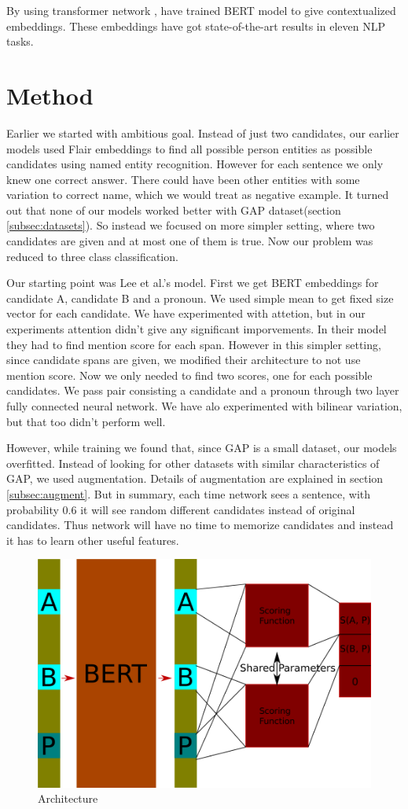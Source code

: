 \documentclass[11pt,a4paper]{article}
\begin{document}
By using transformer network \cite{vaswani2017attention}, \cite{devlin2018bert} have trained BERT model to give contextualized embeddings. These embeddings have got state-of-the-art results in eleven NLP tasks.

\section{Method}
Earlier we started with ambitious goal. Instead of just two candidates, our earlier models used Flair embeddings to find all possible person entities as possible candidates using named entity recognition. However for each sentence we only knew one correct answer. There could have been other entities with some variation to correct name, which we would treat as negative example. It turned out that none of our models worked better with GAP dataset(section \ref{subsec:datasets}). So instead we focused on more simpler setting, where two candidates are given and at most one of them is true. Now our problem was reduced to three class classification.

Our starting point was Lee et al.'s model. First we get BERT embeddings for candidate A, candidate B and a pronoun. We used simple mean to get fixed size vector for each candidate. We have experimented with attetion, but in our experiments attention didn't give any significant imporvements. In their model they had to find mention score for each span. However in this simpler setting, since candidate spans are given, we modified their architecture to not use mention score. Now we only needed to find two scores, one for each possible candidates.  We pass pair consisting a candidate and a pronoun through two layer fully connected neural network.  We have alo experimented with bilinear variation, but that too didn't perform well.  

However, while training we found that, since GAP is a small dataset, our models overfitted. Instead of looking for other datasets with similar characteristics of GAP, we used augmentation. Details of augmentation are explained in section \ref{subsec:augment}. But in summary, each time network sees a sentence, with probability 0.6 it will see random different candidates instead of original candidates. Thus network will have no time to memorize candidates and instead it has to learn other useful features.

\begin{figure}
  \centering
  \includegraphics[width=.4\textwidth]{arch.png}
  \caption{Architecture}
  \label{fig:arch}
\end{figure}
\end{document}
